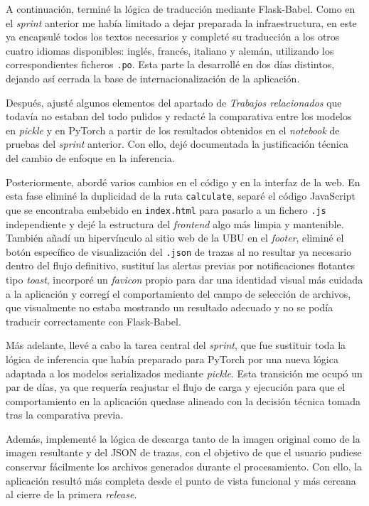 A continuación, terminé la lógica de traducción mediante Flask-Babel. Como en el \textit{sprint} anterior me había limitado a dejar preparada la infraestructura, en este ya encapsulé todos los textos necesarios y completé su traducción a los otros cuatro idiomas disponibles: inglés, francés, italiano y alemán, utilizando los correspondientes ficheros \texttt{.po}. Esta parte la desarrollé en dos días distintos, dejando así cerrada la base de internacionalización de la aplicación.

Después, ajusté algunos elementos del apartado de \textit{Trabajos relacionados} que todavía no estaban del todo pulidos y redacté la comparativa entre los modelos en \textit{pickle} y en PyTorch a partir de los resultados obtenidos en el \textit{notebook} de pruebas del \textit{sprint} anterior. Con ello, dejé documentada la justificación técnica del cambio de enfoque en la inferencia.

Posteriormente, abordé varios cambios en el código y en la interfaz de la web. En esta fase eliminé la duplicidad de la ruta \texttt{calculate}, separé el código JavaScript que se encontraba embebido en \texttt{index.html} para pasarlo a un fichero \texttt{.js} independiente y dejé la estructura del \textit{frontend} algo más limpia y mantenible. También añadí un hipervínculo al sitio web de la UBU en el \textit{footer}, eliminé el botón específico de visualización del \texttt{.json} de trazas al no resultar ya necesario dentro del flujo definitivo, sustituí las alertas previas por notificaciones flotantes tipo \textit{toast}, incorporé un \textit{favicon} propio para dar una identidad visual más cuidada a la aplicación y corregí el comportamiento del campo de selección de archivos, que visualmente no estaba mostrando un resultado adecuado y no se podía traducir correctamente con  Flask-Babel.

Más adelante, llevé a cabo la tarea central del \textit{sprint}, que fue sustituir toda la lógica de inferencia que había preparado para PyTorch por una nueva lógica adaptada a los modelos serializados mediante \textit{pickle}. Esta transición me ocupó un par de días, ya que requería reajustar el flujo de carga y ejecución para que el comportamiento en la aplicación quedase alineado con la decisión técnica tomada tras la comparativa previa.

Además, implementé la lógica de descarga tanto de la imagen original como de la imagen resultante y del JSON de trazas, con el objetivo de que el usuario pudiese conservar fácilmente los archivos generados durante el procesamiento. Con ello, la aplicación resultó más completa desde el punto de vista funcional y más cercana al cierre de la primera \textit{release}.

